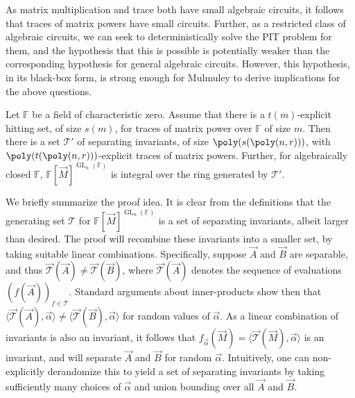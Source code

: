 \documentclass[letterpaper,11pt]{article}
\numberwithin{equation}{section}
\theoremstyle{plain}
\theoremstyle{remark}
\newcommand{\la}{\langle}
\newcommand{\ra}{\rangle}
\DeclareMathOperator{\GL}{GL}
\newcommand{\F}{\mathbb{F}}
\newcommand{\cT}{\mathcal{T}}
\begin{document}
As matrix multiplication and trace both have small algebraic circuits, it follows that traces of matrix powers have small circuits.  Further, as a restricted class of algebraic circuits, we can seek to deterministically solve the PIT problem for them, and the hypothesis that this is possible is potentially weaker than the corresponding hypothesis for general algebraic circuits.  However, this hypothesis, in its black-box form, is strong enough for Mulmuley to derive implications for the above questions.

\begin{theorem*}
	Let $\F$ be a field of characteristic zero. Assume that there is a $t(m)$-explicit hitting set, of size $s(m)$, for traces of matrix power over $\F$ of size $m$.  Then there is a set $\cT'$ of separating invariants, of size $\poly(s(\poly(n,r)))$, with $\poly(t(\poly(n,r)))$-explicit traces of matrix powers.  Further, for algebraically closed $\F$, $\F[\vec{M}]^{\GL_n(\F)}$ is integral over the ring generated by $\cT'$.
\end{theorem*}

We briefly summarize the proof idea.  It is clear from the definitions that the generating set $\cT$ for $\F[\vec{M}]^{\GL_n(\F)}$ is a set of separating invariants, albeit larger than desired.  The proof will recombine these invariants into a smaller set, by taking suitable linear combinations.  Specifically, suppose $\vec{A}$ and $\vec{B}$ are separable, and thus $\vec{\cT}(\vec{A})\ne\vec{\cT}(\vec{B})$, where $\vec{\cT}(\vec{A})$ denotes the sequence of evaluations $(f(\vec{A}))_{f\in\cT}$.  Standard arguments about inner-products show then that $\la\vec{\cT}(\vec{A}),\vec{\alpha}\ra\ne \la\vec{\cT}(\vec{B}),\vec{\alpha}\ra$ for random values of $\vec{\alpha}$.  As a linear combination of invariants is also an invariant, it follows that $f_{\vec{\alpha}}(\vec{M})=\la\vec{\cT}(\vec{M}),\vec{\alpha}\ra$ is an invariant, and will separate $\vec{A}$ and $\vec{B}$ for random $\vec{\alpha}$.  Intuitively, one can non-explicitly derandomize this to yield a set of separating invariants by taking sufficiently many choices of $\vec{\alpha}$ and union bounding over all $\vec{A}$ and $\vec{B}$.
\end{document}
